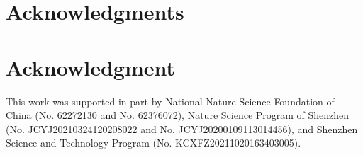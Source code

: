 \documentclass[10pt,journal,compsoc]{IEEEtran}
\begin{document}
%



\ifCLASSOPTIONcompsoc
  \section*{Acknowledgments}
\else
  \section*{Acknowledgment}
\fi

This work was supported in part by National Nature Science Foundation of China (No. 62272130 and No. 62376072), Nature Science Program of Shenzhen (No. JCYJ20210324120208022 and No. JCYJ20200109113014456), and Shenzhen Science and Technology Program (No. KCXFZ20211020163403005).


\ifCLASSOPTIONcaptionsoff
  \newpage
\fi





%
%
%
\end{document}
